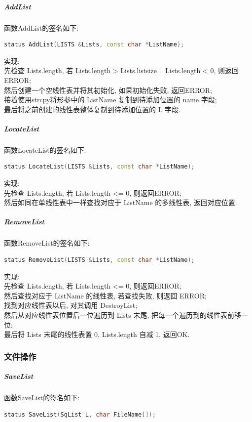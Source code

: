 \documentclass[supercite]{Experimental_Report}
\theoremstyle{definition}
\begin{document}
\subparagraph{AddList}
\noindent
函数AddList的签名如下:
\begin{lstlisting}[language=C++, frame=single]
status AddList(LISTS &Lists, const char *ListName);
\end{lstlisting}

\noindent
实现: \\
先检查 Lists.length, 若 Lists.length > Lists.listsize || Lists.length < 0, 则返回ERROR; \\
然后创建一个空线性表并将其初始化, 如果初始化失败, 返回ERROR; \\
接着使用strcpy将形参中的 ListName 复制到待添加位置的 name 字段; \\
最后将之前创建的线性表整体复制到待添加位置的 L 字段. \\

\subparagraph{LocateList}
\noindent
函数LocateList的签名如下:
\begin{lstlisting}[language=C++, frame=single]
status LocateList(LISTS &Lists, const char *ListName);
\end{lstlisting}

\noindent
实现: \\
先检查 Lists.length, 若 Lists.length <= 0, 则返回ERROR; \\
然后如同在单线性表中一样查找对应于 ListName 的多线性表, 返回对应位置. \\

\subparagraph{RemoveList}
\noindent
函数RemoveList的签名如下:
\begin{lstlisting}[language=C++, frame=single]
status RemoveList(LISTS &Lists, const char *ListName);
\end{lstlisting}

\noindent
实现: \\
先检查 Lists.length, 若 Lists.length <= 0, 则返回ERROR; \\
然后查找对应于 ListName 的线性表, 若查找失败, 则返回 ERROR; \\
找到对应线性表以后, 对其调用 DestroyList; \\
然后从对应线性表位置后一位遍历到 Lists 末尾, 把每一个遍历到的线性表前移一位; \\
最后将 Lists 末尾的线性表置 0, Lists.length 自减 1, 返回OK. \\

\subsubsection{文件操作}

\subparagraph{SaveList}
\noindent
函数SaveList的签名如下:
\begin{lstlisting}[language=C++, frame=single]
status SaveList(SqList L, char FileName[]);
\end{lstlisting}
\end{document}
